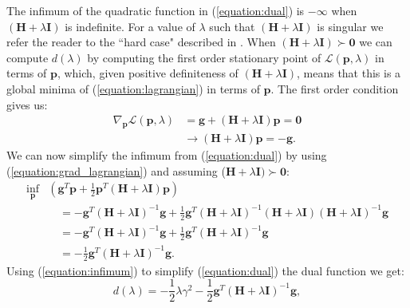 \documentclass[letterpaper,12pt,titlepage,oneside,final]{book}
\begin{document}
	The infimum of the quadratic function in (\ref{equation:dual}) is $-\infty$ when $(\mathbf{H} + \lambda\mathbf{I})$ is indefinite. For a value of $\lambda$ such that $(\mathbf{H} + \lambda\mathbf{I})$ is singular we refer the reader to the ``hard case" described in \cite{adachi.paper}.  When $(\mathbf{H} + \lambda\mathbf{I}) \succ \mathbf{0}$ we can compute $d(\lambda)$ by computing the first order stationary point of $\mathcal{L}(\mathbf{p},\lambda)$ in terms of $\mathbf{p}$, which, given positive definiteness of $(\mathbf{H} + \lambda\mathbf{I})$, means that this is a global minima of (\ref{equation:lagrangian}) in terms of $\mathbf{p}$. The first order condition gives us:
	\begin{equation}
	\begin{aligned}
	\nabla_{\mathbf{p}} \mathcal{L}(\mathbf{p},\lambda) & = \mathbf{g} + (\mathbf{H} + \lambda\mathbf{I}) \mathbf{p} = \mathbf{0} \\
	& \rightarrow (\mathbf{H} + \lambda\mathbf{I})\mathbf{p} = -\mathbf{g}.
	\end{aligned}
	\label{equation:grad_lagrangian}
	\end{equation}
	We can now simplify the infimum from (\ref{equation:dual}) by using (\ref{equation:grad_lagrangian}) and assuming ($\mathbf{H} + \lambda\mathbf{I}) \succ \mathbf{0}$:
	\begin{equation}
	\begin{aligned}
	\underset{\mathbf{p}}{\inf}
	&(\mathbf{g}^{T}\mathbf{p} + \frac{1}{2}\mathbf{p}^{T}(\mathbf{H} + \lambda\mathbf{I})\mathbf{p}) \\ & \quad = -\mathbf{g}^{T}(\mathbf{H} + \lambda\mathbf{I})^{-1}\mathbf{g} + \frac{1}{2}\mathbf{g}^{T}(\mathbf{H} + \lambda\mathbf{I})^{-1}(\mathbf{H} + \lambda\mathbf{I})(\mathbf{H} + \lambda\mathbf{I})^{-1}\mathbf{g}   \\
	& \quad = -\mathbf{g}^{T}(\mathbf{H} + \lambda\mathbf{I})^{-1}\mathbf{g} + \frac{1}{2}\mathbf{g}^{T}(\mathbf{H} + \lambda\mathbf{I})^{-1}\mathbf{g} \\
	& \quad = - \frac{1}{2}\mathbf{g}^{T}(\mathbf{H} + \lambda\mathbf{I})^{-1}\mathbf{g}.
	\end{aligned}
	\label{equation:infimum}
	\end{equation}
	 Using (\ref{equation:infimum}) to simplify (\ref{equation:dual}) the dual function we get:
	\begin{equation}
	d(\lambda)= 
	-\frac{1}{2}\lambda\gamma^{2} - \frac{1}{2}\mathbf{g}^{T}(\mathbf{H} + \lambda\mathbf{I})^{-1}\mathbf{g},
	\label{equation:dual2}
	\end{equation}
\end{document}
